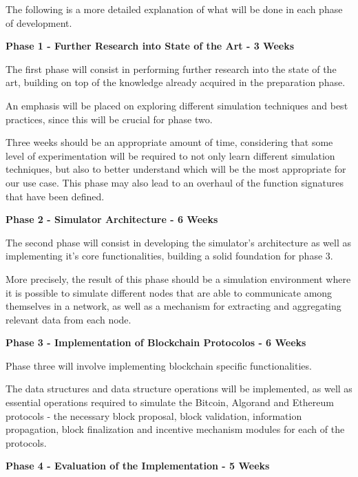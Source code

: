The following is a more detailed explanation of what will be done in each phase of development.

\newpage

\textbf{Phase 1 - Further Research into State of the Art - 3 Weeks}

The first phase will consist in performing further research into the state of the art, building on top of the knowledge already acquired in the preparation phase.

An emphasis will be placed on exploring different simulation techniques and best practices, since this will be crucial for phase two.

Three weeks should be an appropriate amount of time, considering that some level of experimentation will be required to not only learn different simulation techniques, but also to better understand which will be the most appropriate for our use case. This phase may also lead to an overhaul of the function signatures that have been defined.

\vspace{0.25cm}

\textbf{Phase 2 - Simulator Architecture - 6 Weeks}

The second phase will consist in developing the simulator's architecture as well as implementing it's core functionalities, building a solid foundation for phase 3.

More precisely, the result of this phase should be a simulation environment where it is possible to simulate different nodes that are able to communicate among themselves in a network, as well as a mechanism for extracting and aggregating relevant data from each node.

\vspace{0.25cm}

\textbf{Phase 3 - Implementation of Blockchain Protocolos - 6 Weeks}

Phase three will involve implementing blockchain specific functionalities. 

The data structures and data structure operations will be implemented, as well as essential operations required to simulate the Bitcoin, Algorand and Ethereum protocols - the necessary block proposal, block validation, information propagation, block finalization and incentive mechanism modules for each of the protocols.

\vspace{0.25cm}

\textbf{Phase 4 - Evaluation of the Implementation - 5 Weeks}

